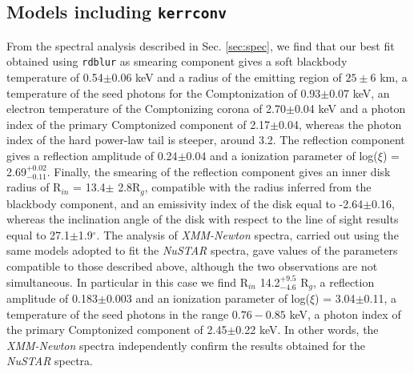 \documentclass{aa}
\begin{document}









\begin{appendix}
\section{Models including \texttt{kerrconv}}
\label{sec:appen}
From the spectral analysis described in Sec. \ref{sec:spec}, we find that our 
best fit obtained using \texttt{rdblur} as smearing component gives a 
soft blackbody temperature of 0.54$\pm$0.06 keV and a radius of the emitting 
region of $25 \pm 6$ km, a temperature of the seed photons for the Comptonization 
of 0.93$\pm$0.07 keV, an electron temperature of the Comptonizing corona of  
2.70$\pm$0.04 keV and a photon index of the primary Comptonized component of  
2.17$\pm$0.04,  whereas the photon index of the hard power-law tail is steeper, 
around 3.2.
The reflection component gives a reflection amplitude of 0.24$\pm$0.04 and a 
ionization parameter of log($\xi$) = 2.69$^{+0.02}_{-0.11}$. Finally, the 
smearing of the reflection component gives an inner disk radius of R$_{in}$ = 
13.4$\pm$ 2.8R$_{g}$, compatible with the radius inferred from the blackbody
component, and an emissivity index of the disk equal to -2.64$\pm$0.16, 
whereas the inclination angle of the disk with respect to the line of sight
results equal to 27.1$\pm$1.9$^\circ$.
The analysis of \emph{XMM-Newton} spectra, carried out using the same models 
adopted to fit the \emph{NuSTAR} spectra, gave values of the parameters
compatible to those described above, although the two observations are
not simultaneous. In particular in this case we find R$_{in}$ 
14.2$^{+9.5}_{-4.6}$ R$_g$, a reflection amplitude of 0.183$\pm$0.003 and an 
ionization parameter of log($\xi$) = 3.04$\pm$0.11, a temperature of the seed photons in 
the range $0.76-0.85$ keV, a photon index of the primary Comptonized component of 
2.45$\pm$0.22 keV. In other words, the \emph{XMM-Newton} spectra independently
confirm the results obtained for the \emph{NuSTAR} spectra.


\end{appendix}
\end{document}
